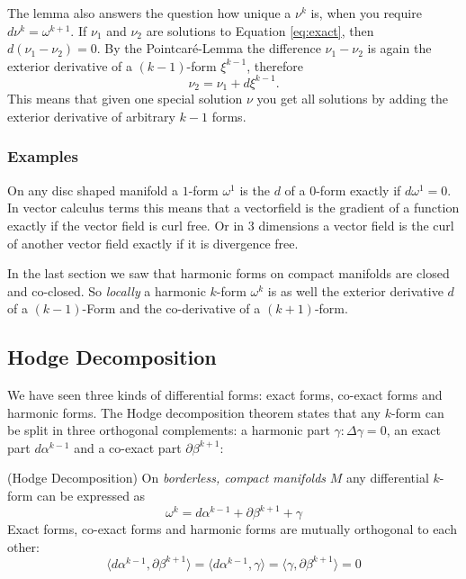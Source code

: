 The lemma also answers the question how unique a $\nu^{k}$ is, when you require $d\nu^{k} = \omega^{k+1}$. If $\nu_1$ and $\nu_2$ are solutions to Equation \ref{eq:exact}, then $d(\nu_1-\nu_2) = 0$. By the Pointcar\'e-Lemma the difference $ \nu_1 - \nu_2$ is again the exterior derivative of a $(k-1)$-form $\xi^{k-1}$, therefore 
\[\nu_2 = \nu_1 +  d\xi^{k-1}.\]
This means that given one special solution $\nu$ you get all solutions by adding the exterior derivative of arbitrary $k-1$ forms.

\subsubsection{Examples}
On any disc shaped manifold a $1$-form $\omega^1$ is the $d$ of a $0$-form exactly if $d\omega^1 = 0$. In vector calculus terms this means that a vectorfield is the gradient of a function exactly if the vector field is curl free. Or in 3 dimensions a vector field is the curl of another vector field exactly if it is divergence free.

In the last section we saw that harmonic forms on compact manifolds are closed and co-closed. So \emph{locally} a harmonic $k$-form $\omega^k$ is as well the exterior derivative $d$ of a $(k-1)$-Form and the co-derivative of a $(k+1)$-form. 

\subsection{Hodge Decomposition}

We have seen three kinds of differential forms: exact forms, co-exact forms and harmonic forms. 
The Hodge decomposition theorem states that any $k$-form can be split in three orthogonal complements: a harmonic part $\gamma: \Delta \gamma = 0$, an exact part $d\alpha^{k-1}$ and a co-exact part $\partial \beta^{k+1}$:
\begin{thm}(Hodge Decomposition)
On \emph{borderless, compact manifolds} $M$ any differential $k$-form can be expressed as
\[\omega^k = d\alpha^{k-1} + \partial \beta^{k+1} + \gamma\]
Exact forms, co-exact forms and harmonic forms are mutually orthogonal to each other:
\[\langle d \alpha^{k-1}, \partial \beta^{k+1}\rangle = \langle d \alpha^{k-1}, \gamma\rangle = \langle \gamma, \partial \beta^{k+1}\rangle =0\]
\end{thm}


